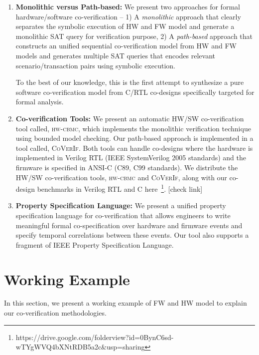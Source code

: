 \documentclass[sigconf]{acmart}
\newcommand{\rmcmt}[1]{{\color{magenta} [{#1}]}}
\newcommand{\tool}[1]{\textsc{#1}\xspace}
\newcommand{\hwcbmcv}{\tool{hw-cbmc}}
\newcommand{\verifox}{\tool{CoVerIf}}
\begin{document}
\begin{enumerate}
  
  \item \textbf{Monolithic versus Path-based:} We present two approaches for formal hardware/software co-verification
    -- 1) A \emph{monolithic} approach that clearly separates the symbolic
    execution of HW and FW model and generate a monolithic SAT query for 
    verification purpose, 2) A \emph{path-based} approach that constructs
    an unified sequential co-verification model from HW and FW models and
    generates multiple SAT queries that encodes relevant scenario/transaction 
    pairs using symbolic execution.  
    
    To the best of our knowledge, this is the first attempt to synthesize a pure 
    software co-verification model from C/RTL co-designs specifically targeted 
    for formal analysis.   
  
  \item \textbf{Co-verification Tools:} We present an automatic HW/SW co-verification 
    tool called, \hwcbmcv, which implements the monolithic verification technique 
    using bounded model checking.  Our path-based approach is implemented in a tool 
    called, \verifox. Both tools can handle co-designs where the hardware is 
    implemented in Verilog RTL (IEEE SystemVerilog 2005 standards) and the firmware is  
    specified in ANSI-C (C89, C99 standards).  We distribute the HW/SW 
    co-verification tools, \hwcbmcv and \verifox, along with our co-design 
    benchmarks in Verilog RTL and C 
    here~\footnote{https://drive.google.com/folderview?id=0BynC6sd-wTYgWVQ4bXNtRDB5a2c\&usp=sharing}.\rmcmt{check
    link}

  \item \textbf{Property Specification Language:} We present a unified property
    specification language for co-verification that allows engineers to write meaningful 
     formal co-specification over hardware and firmware events and specify
     temporal correlations between these events.  Our tool also supports a
     fragment of IEEE Property Specification Language. 
     
    
\end{enumerate}
%
\section{Working Example}
In this section, we present a working example of FW and HW model to explain our 
co-verification methodologies.  
\end{document}
